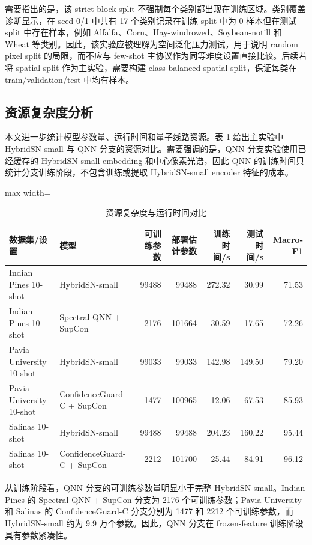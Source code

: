 \documentclass[UTF8,a4paper,zihao=-4,fontset=fandol]{ctexart}
\begin{document}
需要指出的是，该 strict block split 不强制每个类别都出现在训练区域。类别覆盖诊断显示，在 seed 0/1 中共有 17 个类别记录在训练 split 中为 0 样本但在测试 split 中存在样本，例如 Alfalfa、Corn、Hay-windrowed、Soybean-notill 和 Wheat 等类别。因此，该实验应被理解为空间泛化压力测试，用于说明 random pixel split 的局限，而不应与 few-shot 主协议作为同等难度设置直接比较。后续若将 spatial split 作为主实验，需要构建 class-balanced spatial split，保证每类在 train/validation/test 中均有样本。

\subsection{资源复杂度分析}

本文进一步统计模型参数量、运行时间和量子线路资源。表 \ref{tab:resource-complexity} 给出主实验中 HybridSN-small 与 QNN 分支的资源对比。需要强调的是，QNN 分支实验使用已经缓存的 HybridSN-small embedding 和中心像素光谱，因此 QNN 的训练时间只统计分支训练阶段，不包含训练或提取 HybridSN-small encoder 特征的成本。

\begin{table}[htbp]
\centering
\caption{资源复杂度与运行时间对比}
\label{tab:resource-complexity}
\begin{adjustbox}{max width=\textwidth}
\begin{tabular}{llrrrrr}
\toprule
数据集/设置 & 模型 & 可训练参数 & 部署估计参数 & 训练时间/s & 测试时间/s & Macro-F1 \\
\midrule
Indian Pines 10-shot & HybridSN-small & 99488 & 99488 & 272.32 & 30.99 & 71.53 \\
Indian Pines 10-shot & Spectral QNN + SupCon & 2176 & 101664 & 30.59 & 17.65 & 72.26 \\
Pavia University 10-shot & HybridSN-small & 99033 & 99033 & 142.98 & 149.50 & 79.20 \\
Pavia University 10-shot & ConfidenceGuard-C + SupCon & 1477 & 100965 & 12.06 & 67.53 & 85.93 \\
Salinas 10-shot & HybridSN-small & 99488 & 99488 & 204.23 & 160.22 & 95.44 \\
Salinas 10-shot & ConfidenceGuard-C + SupCon & 2212 & 101700 & 25.44 & 84.91 & 96.12 \\
\bottomrule
\end{tabular}
\end{adjustbox}
\end{table}

从训练阶段看，QNN 分支的可训练参数量明显小于完整 HybridSN-small。Indian Pines 的 Spectral QNN + SupCon 分支为 2176 个可训练参数；Pavia University 和 Salinas 的 ConfidenceGuard-C 分支分别为 1477 和 2212 个可训练参数，而 HybridSN-small 约为 9.9 万个参数。因此，QNN 分支在 frozen-feature 训练阶段具有参数紧凑性。
\end{document}
